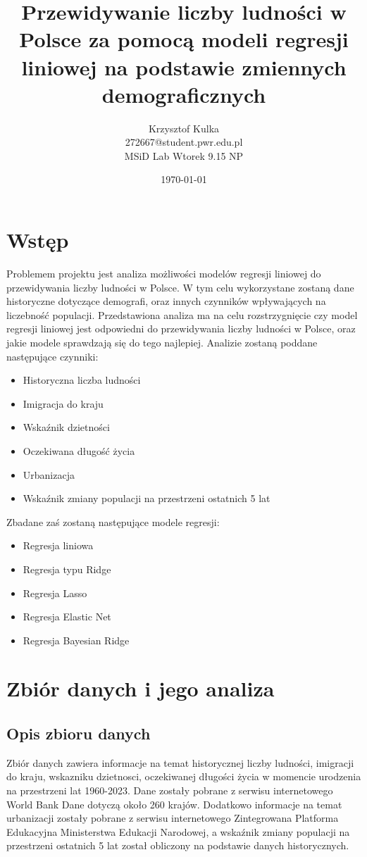 \documentclass[11pt]{article}
\title{ Przewidywanie liczby ludności w Polsce za pomocą modeli regresji liniowej na podstawie zmiennych demograficznych}
\author{ Krzysztof Kulka
        \\ 272667@student.pwr.edu.pl \\ MSiD Lab Wtorek 9.15 NP }
\date{\today}
\begin{document}
\maketitle	
\pagebreak

\setcounter{tocdepth}{4}
\setcounter{secnumdepth}{4}
\tableofcontents
 \pagebreak


\section{Wstęp}
Problemem projektu jest analiza możliwości modelów regresji liniowej do przewidywania liczby ludności w Polsce. W tym celu wykorzystane zostaną dane historyczne dotyczące demografi, oraz innych czynników wpływających na liczebność populacji.
Przedstawiona analiza ma na celu rozstrzygnięcie czy model regresji liniowej jest odpowiedni do przewidywania liczby ludności w Polsce, oraz jakie modele sprawdzają się do tego najlepiej.
Analizie zostaną poddane następujące czynniki:
\begin{itemize}
\item Historyczna liczba ludności
\item Imigracja do kraju
\item Wskaźnik dzietności
\item Oczekiwana długość życia
\item Urbanizacja
\item Wskaźnik zmiany populacji na przestrzeni ostatnich 5 lat
\end{itemize}
Zbadane zaś zostaną następujące modele regresji:
\begin{itemize}
\item Regresja liniowa
\item Regresja typu Ridge
\item Regresja Lasso
\item Regresja Elastic Net
\item Regresja Bayesian Ridge
\end{itemize}
\section{Zbiór danych i jego analiza}
\subsection{Opis zbioru danych}
Zbiór danych zawiera informacje na temat historycznej liczby ludności, imigracji do kraju, wskazniku dzietnosci, oczekiwanej
długości życia w momencie urodzenia na przestrzeni lat 1960-2023.
Dane zostały pobrane z serwisu internetowego World Bank\cite{wbd} Dane dotyczą około 260 krajów. 
Dodatkowo informacje na temat urbanizacji
zostały pobrane z serwisu internetowego Zintegrowana Platforma Edukacyjna Ministerstwa Edukacji Narodowej\cite{zpe}, a wskaźnik zmiany populacji na przestrzeni ostatnich 5 lat został obliczony na podstawie danych historycznych.
\end{document}
